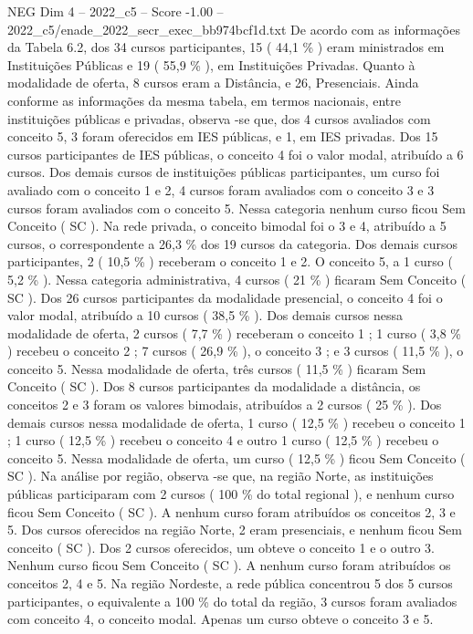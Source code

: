 \begin{textsample}{NEG Dim 4 – 2022\_c5 – Score -1.00 – 2022\_c5/enade\_2022\_secr\_exec\_bb974bcf1d.txt}
De acordo com as informações da Tabela 6.2, dos 34 cursos participantes, 15 ( 44,1 \% ) eram ministrados em Instituições Públicas e 19 ( 55,9 \% ), em Instituições Privadas.
Quanto à modalidade de oferta, 8 cursos eram a Distância, e 26, Presenciais.
Ainda conforme as informações da mesma tabela, em termos nacionais, entre instituições públicas e privadas, observa -se que, dos 4 cursos avaliados com conceito 5, 3 foram oferecidos em IES públicas, e 1, em IES privadas.
Dos 15 cursos participantes de IES públicas, o conceito 4 foi o valor modal, atribuído a 6 cursos.
Dos demais cursos de instituições públicas participantes, um curso foi avaliado com o conceito 1 e 2, 4 cursos foram avaliados com o conceito 3 e 3 cursos foram avaliados com o conceito 5.
Nessa categoria nenhum curso ficou Sem Conceito ( SC ).
Na rede privada, o conceito bimodal foi o 3 e 4, atribuído a 5 cursos, o correspondente a 26,3 \% dos 19 cursos da categoria.
Dos demais cursos participantes, 2 ( 10,5 \% ) receberam o conceito 1 e 2.
O conceito 5, a 1 curso ( 5,2 \% ).
Nessa categoria administrativa, 4 cursos ( 21 \% ) ficaram Sem Conceito ( SC ).
Dos 26 cursos participantes da modalidade presencial, o conceito 4 foi o valor modal, atribuído a 10 cursos ( 38,5 \% ).
Dos demais cursos nessa modalidade de oferta, 2 cursos ( 7,7 \% ) receberam o conceito 1 ; 1 curso ( 3,8 \% ) recebeu o conceito 2 ; 7 cursos ( 26,9 \% ), o conceito 3 ; e 3 cursos ( 11,5 \% ), o conceito 5.
Nessa modalidade de oferta, três cursos ( 11,5 \% ) ficaram Sem Conceito ( SC ).
Dos 8 cursos participantes da modalidade a distância, os conceitos 2 e 3 foram os valores bimodais, atribuídos a 2 cursos ( 25 \% ).
Dos demais cursos nessa modalidade de oferta, 1 curso ( 12,5 \% ) recebeu o conceito 1 ; 1 curso ( 12,5 \% ) recebeu o conceito 4 e outro 1 curso ( 12,5 \% ) recebeu o conceito 5.
Nessa modalidade de oferta, um curso ( 12,5 \% ) ficou Sem Conceito ( SC ).
Na análise por região, observa -se que, na região Norte, as instituições públicas participaram com 2 cursos ( 100 \% do total regional ), e nenhum curso ficou Sem Conceito ( SC ).
A nenhum curso foram atribuídos os conceitos 2, 3 e 5.
Dos cursos oferecidos na região Norte, 2 eram presenciais, e nenhum ficou Sem conceito ( SC ).
Dos 2 cursos oferecidos, um obteve o conceito 1 e o outro 3.
Nenhum curso ficou Sem Conceito ( SC ).
A nenhum curso foram atribuídos os conceitos 2, 4 e 5.
Na região Nordeste, a rede pública concentrou 5 dos 5 cursos participantes, o equivalente a 100 \% do total da região, 3 cursos foram avaliados com conceito 4, o conceito modal.
Apenas um curso obteve o conceito 3 e 5.

\end{textsample}
